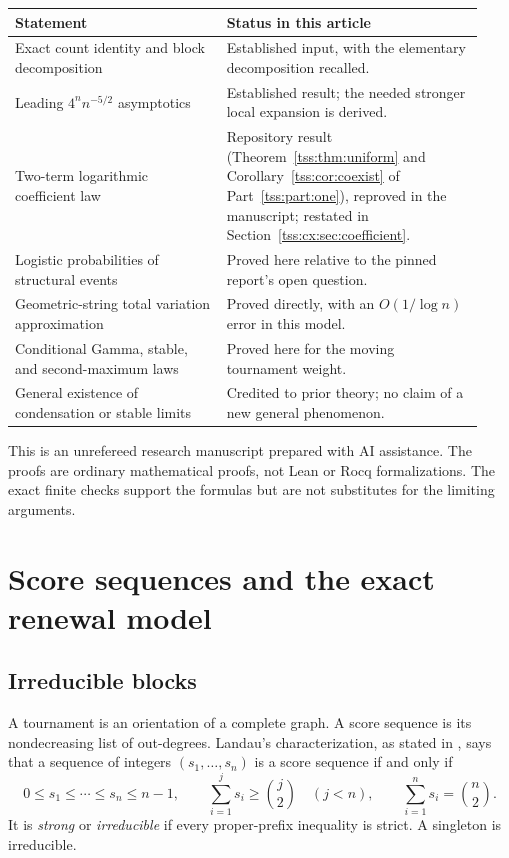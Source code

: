 \documentclass[11pt]{article}
\theoremstyle{remark}\newtheorem{remark}[theorem]{Remark}
\theoremstyle{definition}\newtheorem{definition}[theorem]{Definition}
\begin{document}
\begin{center}\small
\begin{tabular}{@{}>{\raggedright\arraybackslash}p{0.42\linewidth}>{\raggedright\arraybackslash}p{0.51\linewidth}@{}}
\toprule
Statement & Status in this article\\
\midrule
Exact count identity and block decomposition & Established input, with the elementary decomposition recalled.\\
Leading $4^n n^{-5/2}$ asymptotics & Established result; the needed stronger local expansion is derived.\\
Two-term logarithmic coefficient law & Repository result (Theorem~\ref{tss:thm:uniform} and Corollary~\ref{tss:cor:coexist} of Part~\ref{tss:part:one}), reproved in the manuscript; restated in Section~\ref{tss:cx:sec:coefficient}.\\
Logistic probabilities of structural events & Proved here relative to the pinned report's open question.\\
Geometric-string total variation approximation & Proved directly, with an $O(1/\log n)$ error in this model.\\
Conditional Gamma, stable, and second-maximum laws & Proved here for the moving tournament weight.\\
General existence of condensation or stable limits & Credited to prior theory; no claim of a new general phenomenon.\\
\bottomrule
\end{tabular}
\end{center}

This is an unrefereed research manuscript prepared with AI assistance.
The proofs are ordinary mathematical proofs, not Lean or Rocq
formalizations. The exact finite checks support the formulas but are
not substitutes for the limiting arguments.

\section{Score sequences and the exact renewal model}
\label{tss:cx:sec:model}

\subsection{Irreducible blocks}
A tournament is an orientation of a complete graph. A score sequence
is its nondecreasing list of out-degrees. Landau's characterization,
as stated in \cite{CDFS}, says that a sequence of integers
$(s_1,\ldots,s_n)$ is a score sequence if and only if
\begin{equation}\label{tss:cx:eq:landau}
 0\le s_1\le\cdots\le s_n\le n-1,\qquad
 \sum_{i=1}^j s_i\ge\binom j2\quad(j<n),\qquad
 \sum_{i=1}^n s_i=\binom n2.
\end{equation}
It is \emph{strong} or \emph{irreducible} if every proper-prefix
inequality is strict. A singleton is irreducible.
\end{document}
